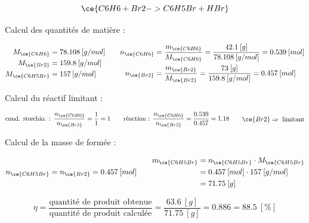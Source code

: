 \documentclass[
  11pt,
  a4paper,
  openany]{book}
\begin{document}
\begin{Answer}
\[ \ce{C6H6 + Br2 -> C6H5Br + HBr} \]

Calcul des quantités de matière :

\[ \begin{split}
        M_{\ce{C6H6}} &= 78.108\:[g/mol] \\
        M_{\ce{Br2}} &= 159.8\:[g/mol] \\
        M_{\ce{C6H5Br}} &= 157\:[g/mol]
    \end{split}
    \qquad
    \begin{split}
        n_{\ce{C6H6}} &= \frac{m_{\ce{C6H6}}}{M_{\ce{C6H6}}} = \frac{42.1\:[g]}{78.108\:[g/mol]} = 0.539\:[mol] \\
        n_{\ce{Br2}} &= \frac{m_{\ce{Br2}}}{M_{\ce{Br2}}} = \frac{73\:[g]}{159.8\:[g/mol]} = 0.457\:[mol]
    \end{split} \]

Calcul du réactif limitant :

\[ \begin{split}
            \text{cond. stœchio. : }\frac{n_{\ce{C6H6}}}{n_{\ce{Br2}}} = \frac{1}{1} = 1
        \end{split}
        \qquad
        \begin{split}
            \text{réaction : }\frac{n_{\ce{C6H6}}}{n_{\ce{Br2}}} = \frac{0.539}{0.457} = 1.18
        \end{split}
        \qquad
        \begin{split}
            \ce{Br2} \Rightarrow\text{ limitant}
        \end{split} \]

Calcul de la masse de  formée :

\[ \begin{split}
            n_{\ce{C6H5Br}} = n_{\ce{Br2}} = 0.457\:[mol]
        \end{split}
        \qquad
        \begin{split}
            m_{\ce{C6H5Br}} &= n_{\ce{C6H5Br}} \cdot M_{\ce{C6H5Br}} \\
            &= 0.457\:[mol] \cdot 157\:[g/mol]\\
            &= 71.75\:[g]
        \end{split} \]

\[ \eta = \frac{\text{quantité de produit obtenue}}{\text{quantité de produit calculée}} = \frac{63.6\:[g]}{71.75\:[g]} = 0.886 = 88.5\:[\%] \]

\end{Answer}
\end{document}
